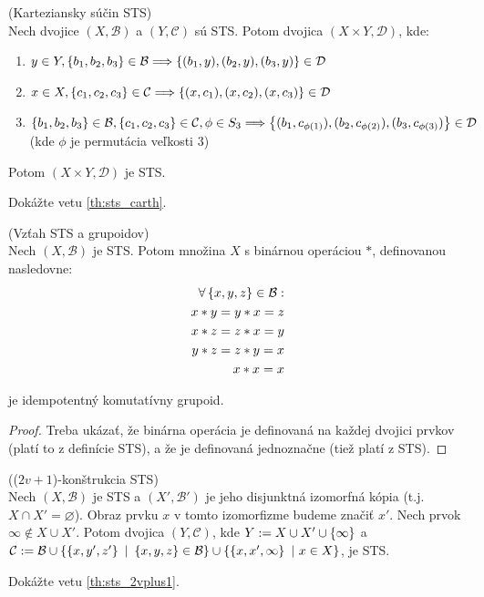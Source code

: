 \begin{theorem}{(Karteziansky súčin STS)}\\
\label{th:sts_carth}
Nech dvojice $(X, \mathcal{B})$ a $(Y, \mathcal{C})$ sú STS. Potom dvojica $(X \times Y, \mathcal{D})$, kde:
\begin{enumerate}
    \item $y \in Y, \left\{b_1, b_2, b_3\right\} \in \mathcal{B} \Longrightarrow \left\{(b_1, y), (b_2, y), (b_3, y)\right\} \in \mathcal{D}$
    \item $x \in X, \left\{c_1, c_2, c_3\right\} \in \mathcal{C} \Longrightarrow \left\{(x, c_1), (x, c_2), (x, c_3)\right\} \in \mathcal{D}$
    \item $\left\{b_1, b_2, b_3\right\} \in \mathcal{B}, \left\{c_1, c_2, c_3\right\} \in \mathcal{C}, \phi \in S_3 \Longrightarrow 
            \left\{(b_1, c_{\phi(1)}), (b_2, c_{\phi(2)}), (b_3, c_{\phi(3)})\right\} \in \mathcal{D}$ (kde $\phi$ je permutácia veľkosti $3$) 
\end{enumerate}
Potom $(X \times Y, \mathcal{D})$ je STS.
\end{theorem}
\begin{exercise}
Dokážte vetu \ref{th:sts_carth}.
\end{exercise}


\begin{theorem}{(Vzťah STS a grupoidov)}\\
Nech $(X, \mathcal{B})$ je STS. Potom množina $X$ s binárnou operáciou $\ast$, definovanou nasledovne:
\begin{align*}
    \forall \left\{x,y,z\right\} \in \mathcal{B}:\\
    x\ast y = y \ast x = z\\ 
    x \ast z = z \ast x = y\\ 
    y\ast z = z \ast y = x\\
    x \ast x = x
\end{align*}

je idempotentný komutatívny grupoid. 
\end{theorem}
\begin{proof}
Treba ukázať, že binárna operácia je definovaná na každej dvojici prvkov (platí to z definície STS), a že je definovaná jednoznačne (tiež platí z STS).
\end{proof}

\begin{theorem}{(($2v +1$)-konštrukcia STS)}\\
\label{th:sts_2vplus1}
Nech $(X, \mathcal{B})$ je STS a $(X', \mathcal{B}')$ je jeho disjunktná izomorfná kópia (t.j. $X \cap  X' = \varnothing$). Obraz prvku $x$ v tomto izomorfizme budeme značiť $x'$. 
Nech prvok $\infty \notin X \cup X'$.
Potom dvojica $(Y, \mathcal{C})$, kde $Y := X \cup X' \cup \left\{\infty\right\}$ a $\mathcal{C} := \mathcal{B} 
\cup \left\{\left\{x, y', z'\right\} ~|~ \left\{x,y,z\right\}\in \mathcal{B}\right\} 
\cup \left\{\left\{x, x', \infty\right\} ~|~ x \in X\right\}$, je STS.    
\end{theorem}
\begin{exercise}
Dokážte vetu \ref{th:sts_2vplus1}.
\end{exercise}

